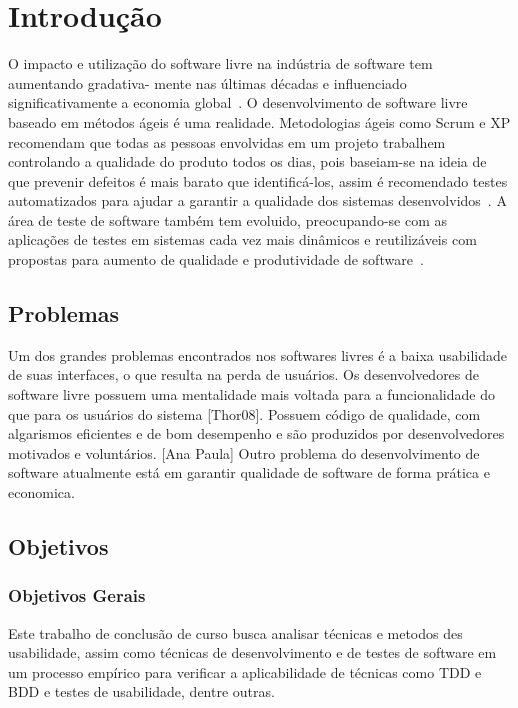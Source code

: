 	\chapter{Introdução}

	O impacto e utilização do software livre na indústria de software tem aumentando gradativa-
	mente nas últimas décadas e influenciado significativamente a economia global~\cite{benkler2006}. 
	O desenvolvimento de software livre baseado em métodos ágeis é uma realidade. Metodologias ágeis 
	como Scrum e XP recomendam que todas as pessoas envolvidas em um projeto trabalhem controlando a 
	qualidade do produto todos os dias, pois baseiam-se na ideia de que prevenir defeitos é mais barato
	que identificá-los, assim é recomendado testes automatizados para ajudar a garantir a qualidade dos 
	sistemas desenvolvidos~\cite{bernardo2011}.
	A área de teste de software também tem evoluido, preocupando-se com as aplicações de testes
	em sistemas cada vez mais dinâmicos e reutilizáveis com propostas para aumento de qualidade
	e produtividade de software~\cite{vicente2010}.
	\section{Problemas}
	Um dos grandes problemas encontrados nos softwares livres é a baixa usabilidade de suas interfaces, o que resulta na perda de usuários. 
	Os desenvolvedores de software livre possuem uma mentalidade mais voltada para a funcionalidade do que para os usuários do sistema [Thor08]. Possuem código de qualidade, com algarismos eficientes e de bom desempenho e são produzidos por desenvolvedores motivados e voluntários. [Ana Paula] 
	Outro problema do desenvolvimento de software atualmente está em garantir qualidade de software de 
	forma prática e economica.

	\section{Objetivos}

	\subsection{Objetivos Gerais}
	 
	Este trabalho de conclusão de curso busca analisar técnicas e metodos des usabilidade, assim como técnicas de desenvolvimento e de testes de software em um processo empírico para verificar a aplicabilidade de técnicas como TDD e BDD e testes de usabilidade, dentre outras.
	

